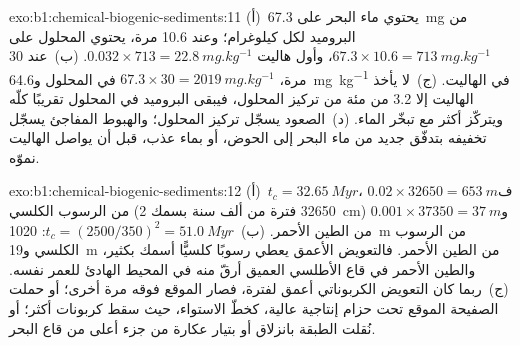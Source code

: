 \begin{solution}{exo:b1:chemical-biogenic-sediments:11}
(أ)~يحتوي ماء البحر على \qty{67.3}{mg} من البروميد لكل كيلوغرام؛ وعند \num{10.6} مرة، يحتوي المحلول على $67.3\times10.6 = \qty{713}{mg.kg^{-1}}$، وأول هاليت $0.032\times713 = \qty{22.8}{mg.kg^{-1}}$. (ب)~عند 30 مرة، $67.3\times30 =
\qty{2019}{mg.kg^{-1}}$ في المحلول و\qty{64.6}{mg.kg^{-1}} في الهاليت. (ج)~لا يأخذ الهاليت إلا \num{3.2} من مئة من تركيز المحلول، فيبقى البروميد في المحلول تقريبًا كلّه ويتركّز أكثر مع تبخّر الماء. (د)~الصعود يسجّل تركيز المحلول؛ والهبوط المفاجئ يسجّل تخفيفه بتدفّق جديد من ماء البحر إلى الحوض، أو بماء عذب، قبل أن يواصل الهاليت نموّه.
\end{solution}

\begin{solution}{exo:b1:chemical-biogenic-sediments:12}
(أ)~$t_c = \qty{32.65}{Myr}$، ف$0.02\times\num{32650} = \qty{653}{m}$ من الرسوب الكلسي (\num{32650} فترة من ألف سنة بسمك \qty{2}{cm}) و$0.001\times\num{37350} = \qty{37}{m}$ من الطين الأحمر. (ب)~$t_c = (2500/350)^2 =
\qty{51.0}{Myr}$: \qty{1020}{m} من الرسوب الكلسي و\qty{19}{m} من الطين الأحمر. فالتعويض الأعمق يعطي رسوبًا كلسيًّا أسمك بكثير، والطين الأحمر في قاع الأطلسي العميق أرقّ منه في المحيط الهادئ للعمر نفسه. (ج)~ربما كان التعويض الكربوناتي أعمق لفترة، فصار الموقع فوقه مرة أخرى؛ أو حملت الصفيحة الموقع تحت حزام إنتاجية عالية، كخطّ الاستواء، حيث سقط كربونات أكثر؛ أو نُقلت الطبقة بانزلاق أو بتيار عكارة من جزء أعلى من قاع البحر.
\end{solution}

